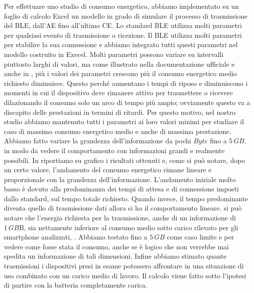 Per effettuare uno studio di consumo energetico, abbiamo implementato su un foglio di calcolo Excel un modello in grado di simulare il processo di trasmissione del \acs{BLE}, dall'\acf{AE} fino all'ultimo \acf{CE}. Lo standard \acs{BLE} utilizza molti parametri per qualsiasi evento di trasmissione o ricezione. Il BLE utilizza molti parametri per stabilire la sua connessione e abbiamo integrato tutti questi parametri nel modello costruito in Execel. Molti parametri possono variare su intervalli piuttosto larghi di valori, ma come illustrato nella documentazione ufficiale \cite{BT-CoreSpec4.0} e anche in \cite{sensor2012}, più i valori dei parametri crescono più il consumo energetico medio richiesto diminuisce. Questo perché aumentano i tempi di riposo e diminuiscono i momenti in cui il dispositivo deve rimanere attivo per trasmettere o ricevere dilazionando il consumo solo un arco di tempo più ampio; ovviamente questo va a discapito delle prestazioni in termini di ritardi. Per questo motivo, nel nostro studio abbiamo mantenuto tutti i parametri ai loro valori minimi per studiare il caso di massimo consumo energetico medio e anche di massima prestazione. Abbiamo fatto variare la grandezza dell'informazione da pochi $Byte$ fino a $5\,GB$, in modo da vedere il comportamento con informazioni grandi e realmente possibili. In  riportiamo su grafico i risultati ottenuti e, come si può notare, dopo un certo valore, l'andamento del consumo energetico rimane lineare e proporzionale con la grandezza dell'informazione. L'andamento iniziale molto basso è dovuto alla predominanza dei tempi di attesa e di connessione imposti dallo standard, sul tempo totale richiesto. Quando invece, il tempo predominante diventa quello di trasmissione dati allora si ha il comportamento lineare. si può notare che l'energia richiesta per la trasmissione, anche di un informazione di $1\,GB$B, sia nettamente inferiore al consumo medio sotto carico rilevato per gli smartphone analizzati, . Abbiamo testato fino a $5\,GB$ come caso limite e per vedere come fosse stata il consumo, anche se è logico che non verrebbe mai spedita un informazione di tali dimensioni. Infine abbiamo stimato quante trasmissioni i dispositivi presi in esame potessero affrontare in una situazione di uso combinato con un carico medio di lavoro. Il calcolo viene fatto sotto l'ipotesi di partire con la batteria completamente carica.

